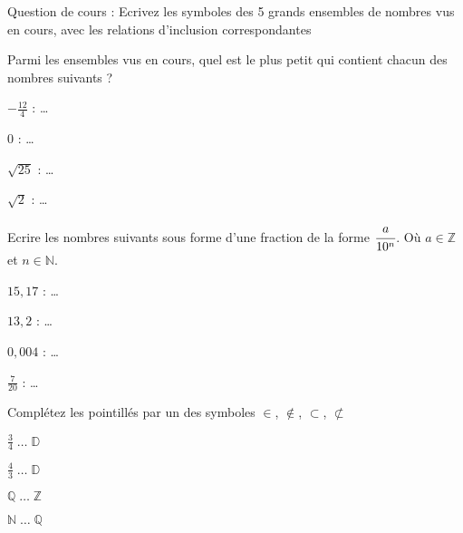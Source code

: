 \documentclass[10pt,a4paper]{exam}
\newcommand{\N}{\mathbb{N}}
\newcommand{\Z}{\mathbb{Z}}
\begin{document}
  
 
Question de cours : Ecrivez les symboles des 5 grands ensembles de nombres vus en cours, avec les relations d'inclusion correspondantes\newline
{}

Parmi les ensembles vus en cours, quel est le plus petit qui contient chacun des nombres suivants ?
\begin{multicols}{4}
 \item $-\frac{12}{4}$ : \ldots
 \item $0$ : \ldots
 \item $\sqrt{25}$ : \ldots
 \item $\sqrt{2}$ : \ldots
\end{multicols}
 
 
Ecrire les nombres suivants sous forme d'une fraction de la forme 
$\cfrac{a}{10^{n}}$. Où $a\in\Z$ et $n\in\N$.
\begin{multicols}{4}
 \item $15{,}17$ : \ldots
 \item $13{,}2$ : \ldots
 \item $0{,}004$ : \ldots
 \item $\frac{7}{20}$ : \ldots
\end{multicols}
 


Complétez les pointillés par un des symboles $\in$, $\notin$, $\subset$, $\not\subset$
\begin{multicols}{4}
    \item $\frac{3}{4}\;\ldots\;\mathbb{D}$
    \item $\frac{4}{3}\;\ldots\;\mathbb{D}$
    \item $\mathbb{Q}\;\ldots\;\mathbb{Z}$
    \item $\mathbb{N}\;\ldots\;\mathbb{Q}$
\end{multicols}
 
 
\end{document}
